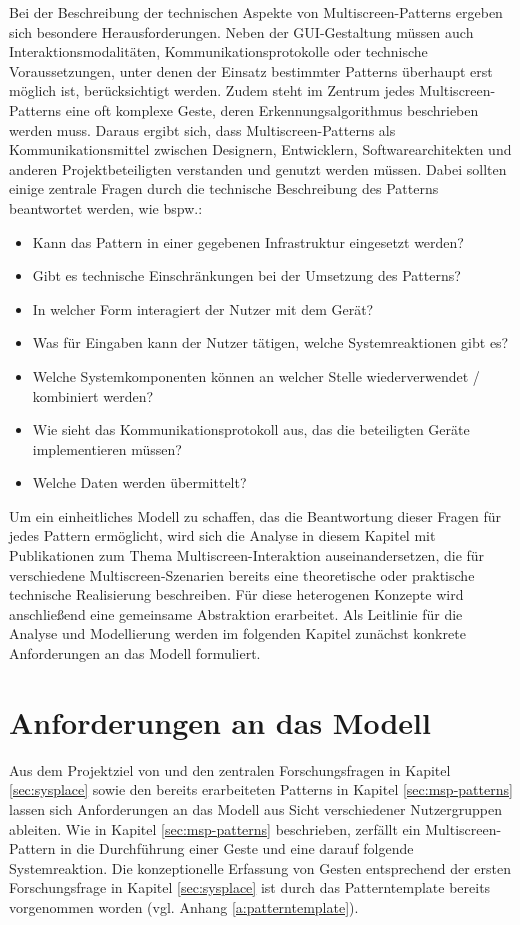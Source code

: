 Bei der Beschreibung der technischen Aspekte von Multiscreen-Patterns ergeben sich  besondere Herausforderungen. Neben der \acs{GUI}-Gestaltung müssen auch Interaktionsmodalitäten, Kommunikationsprotokolle oder technische Voraussetzungen, unter denen der Einsatz bestimmter Patterns überhaupt erst möglich ist, berücksichtigt werden. Zudem steht im Zentrum jedes Multiscreen-Patterns eine oft komplexe Geste, deren Erkennungsalgorithmus beschrieben werden muss. Daraus ergibt sich, dass Multiscreen-Patterns als Kommunikationsmittel zwischen Designern, Entwicklern, Softwarearchitekten und anderen Projektbeteiligten verstanden und genutzt werden müssen. Dabei sollten einige zentrale Fragen durch die technische Beschreibung des Patterns beantwortet werden, wie bspw.:
\begin{itemize}
\item Kann das Pattern in einer gegebenen Infrastruktur eingesetzt werden?
\item Gibt es technische Einschränkungen bei der Umsetzung des Patterns?
\item In welcher Form interagiert der Nutzer mit dem Gerät?
\item Was für Eingaben kann der Nutzer tätigen, welche Systemreaktionen gibt es?
\item Welche Systemkomponenten können an welcher Stelle wiederverwendet / kombiniert werden?
\item Wie sieht das Kommunikationsprotokoll aus, das die beteiligten Geräte implementieren müssen? 
\item Welche Daten werden übermittelt?
\end{itemize}
Um ein einheitliches Modell zu schaffen, das die Beantwortung dieser Fragen für jedes Pattern ermöglicht, wird sich die Analyse in diesem Kapitel mit Publikationen zum Thema Multiscreen-Interaktion auseinandersetzen, die für verschiedene Multiscreen-Szenarien bereits eine theoretische oder praktische technische Realisierung beschreiben. Für diese heterogenen Konzepte wird anschließend eine gemeinsame Abstraktion erarbeitet. Als Leitlinie für die Analyse und Modellierung werden im folgenden Kapitel zunächst konkrete Anforderungen an das Modell formuliert.

\section{Anforderungen an das Modell}
\label{sec:requirements}
Aus dem Projektziel von \sysplace und den zentralen Forschungsfragen in Kapitel \ref{sec:sysplace} sowie den bereits erarbeiteten Patterns in Kapitel \ref{sec:msp-patterns} lassen sich Anforderungen an das Modell aus Sicht verschiedener Nutzergruppen ableiten.
Wie in Kapitel \ref{sec:msp-patterns} beschrieben, zerfällt ein Multiscreen-Pattern in die Durchführung einer Geste und eine darauf folgende Systemreaktion. Die konzeptionelle Erfassung von Gesten entsprechend der ersten Forschungsfrage in Kapitel \ref{sec:sysplace} ist durch das Patterntemplate bereits vorgenommen worden (vgl. Anhang \ref{a:patterntemplate}). 

